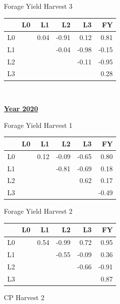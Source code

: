 \documentclass[12pt, letterpaper]{article}
\begin{document}
\begin{table}[h]
\begin{minipage}[h]{.45\textwidth}
\bigskip
\bigskip

Forage Yield Harvest 3

\medskip

\begin{tabular}{rrrrrr}
 & L0 & L1 & L2 & L3 & FY \\ 
  \hline
  L0 &  & 0.04 & -0.91 & 0.12 & 0.81 \\ 
  L1 & &  & -0.04 & -0.98 & -0.15 \\ 
  L2 & & &  & -0.11 & -0.95 \\ 
  L3 & & & &  & 0.28 \\ 
   \hline
\end{tabular}
\end{minipage}%
\begin{minipage}[h]{.05\textwidth}
\
\end{minipage}%
\begin{minipage}[h]{.45\textwidth}
\centering

\textbf{\underline{Year 2020}}

\medskip

Forage Yield Harvest 1

\medskip

\begin{tabular}{rrrrrr}
 & L0 & L1 & L2 & L3 & FY \\ 
  \hline
  L0 &   & 0.12 & -0.09 & -0.65 & 0.80 \\ 
  L1 & &   & -0.81 & -0.69 & 0.18 \\ 
  L2 & & &   & 0.62 & 0.17 \\ 
  L3 & & & &   & -0.49 \\ 
   \hline
\end{tabular}

\bigskip
\bigskip

Forage Yield Harvest 2

\medskip

\begin{tabular}{rrrrrr}
 & L0 & L1 & L2 & L3 & FY \\ 
  \hline
  L0 &   & 0.54 & -0.99 & 0.72 & 0.95 \\ 
  L1 & &   & -0.55 & -0.09 & 0.36 \\ 
  L2 & & &   & -0.66 & -0.91 \\ 
  L3 & & & &   & 0.87 \\ 
   \hline
\end{tabular}

\bigskip
\bigskip

CP Harvest 2


\end{minipage}
\end{table}
\end{document}
